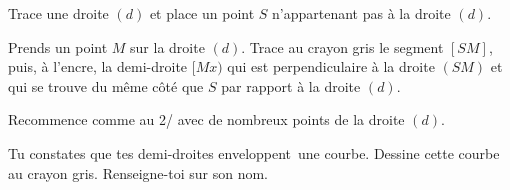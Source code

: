 \begin{myenumerate}
  \item Trace une droite $(d)$ et place un point $S$ n'appartenant pas à la droite $(d)$.
  \item Prends un point $M$ sur la droite $(d)$. Trace au crayon gris le segment $[SM]$, puis, à l'encre, la demi-droite $[Mx)$ qui est perpendiculaire à la droite $(SM)$ et qui se trouve du même côté que $S$ par rapport à la droite $(d)$.
  \item Recommence comme au 2/ avec de nombreux points de la droite $(d)$.
  \item Tu constates que tes demi-droites \og enveloppent\fg\ une courbe. Dessine cette courbe au crayon gris. Renseigne-toi sur son nom.
\end{myenumerate}